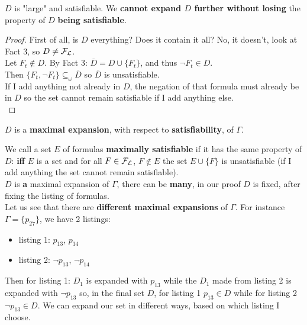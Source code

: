 \documentclass[11pt]{article}
\begin{document}
	$D$ is "large" and satisfiable. We \textbf{cannot expand $D$ further without losing} the property of $D$ \textbf{being satisfiable}.\\
	
	\begin{proof}
		First of all, is $D$ everything? Does it contain it all? No, it doesn't, look at Fact 3, so $D \neq \mathcal{F}_\mathcal{L}$. \\
		
		Let $F_t \notin D$. By Fact 3: $\overline{D} = D \cup \{F_t\}$, and thus $\neg F_t \in D$. \\
		Then $\{F_t, \neg F_t\} \subseteq_\omega \overline{D}$ so $\overline{D}$ is unsatisfiable.\\
		If I add anything not already in $D$, the negation of that formula must already be in $D$ so the set cannot remain satisfiable if I add anything else.\\
	\end{proof}
	
	$D$ is a \textbf{maximal expansion}, with respect to \textbf{satisfiability}, of $\Gamma$.\\
	
	\newpage
	
	We call a set $E$ of formulas \textbf{maximally satisfiable} if it has the same property of $D$: \textbf{iff} $E$ is a set and for all $F \in \mathcal{F}_\mathcal{L}$, $F \notin E$ the set $E \cup \{F\}$ is unsatisfiable (if I add anything the set cannot remain satisfiable).\\
	
	$D$ is \textbf{a} maximal expansion of $\Gamma$, there can be \textbf{many}, in our proof $D$ is fixed, after fixing the listing of formulas.\\
	
	Let us see that there are \textbf{different maximal expansions} of $\Gamma$. For instance $\Gamma = \{p_{27}\}$, we have 2 listings:
	\begin{itemize}
		\item listing 1: $p_{13}$, $p_{14}$
		\item listing 2: $\neg p_{13}$, $\neg p_{14}$
	\end{itemize}
	
	Then for listing 1: $D_1$ is expanded with $p_{13}$ while the $D_1$ made from listing 2 is expanded with $\neg p_{13}$ so, in the final set $D$, for listing 1 $p_{13} \in D$ while for listing 2 $\neg p_{13} \in D$. We can expand our set in different ways, based on which listing I choose.\\
	
\end{document}
